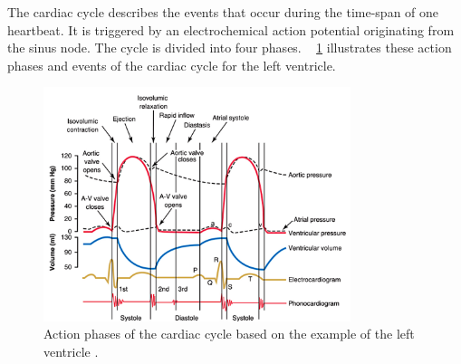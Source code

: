The cardiac cycle describes the events that occur during the time-span of one heartbeat. It is triggered by an electrochemical action potential originating from the sinus node. The cycle is divided into four phases. \figurename~ \ref{fig:cardiac_cycle} illustrates these action phases and events of the cardiac cycle for the left ventricle.
\begin{figure}[h]
  \centering
  \includegraphics[width=0.8\textwidth]{images/cardiac_cycle.jpg}
  \caption[Action phases of left ventricular cardiac cycle]{Action phases of the cardiac cycle based on the example of the left ventricle \cite{GH20}.}
  \label{fig:cardiac_cycle}
\end{figure}

